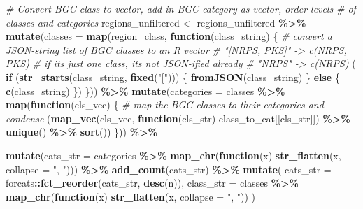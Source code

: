 \documentclass[
]{article}
\newenvironment{Shaded}{\begin{snugshade}}{\end{snugshade}}
\newcommand{\AttributeTok}[1]{\textcolor[rgb]{0.13,0.29,0.53}{#1}}
\newcommand{\CommentTok}[1]{\textcolor[rgb]{0.56,0.35,0.01}{\textit{#1}}}
\newcommand{\ControlFlowTok}[1]{\textcolor[rgb]{0.13,0.29,0.53}{\textbf{#1}}}
\newcommand{\FunctionTok}[1]{\textcolor[rgb]{0.13,0.29,0.53}{\textbf{#1}}}
\newcommand{\NormalTok}[1]{#1}
\newcommand{\OtherTok}[1]{\textcolor[rgb]{0.56,0.35,0.01}{#1}}
\newcommand{\SpecialCharTok}[1]{\textcolor[rgb]{0.81,0.36,0.00}{\textbf{#1}}}
\newcommand{\StringTok}[1]{\textcolor[rgb]{0.31,0.60,0.02}{#1}}
\begin{document}
\begin{Shaded}
\begin{Highlighting}[]
\CommentTok{\# Convert BGC \textquotesingle{}class\textquotesingle{} to vector, add in BGC \textquotesingle{}category\textquotesingle{} as vector, order levels}
\CommentTok{\# of classes and categories}
\NormalTok{regions\_unfiltered }\OtherTok{\textless{}{-}}\NormalTok{ regions\_unfiltered }\SpecialCharTok{\%\textgreater{}\%}
  \FunctionTok{mutate}\NormalTok{(}\AttributeTok{classes =} \FunctionTok{map}\NormalTok{(region\_class, }\ControlFlowTok{function}\NormalTok{(class\_string) \{}
    \CommentTok{\# convert a JSON{-}string list of BGC classes to an R vector}
    \CommentTok{\# "[\textquotesingle{}NRPS\textquotesingle{}, \textquotesingle{}PKS\textquotesingle{}]" {-}\textgreater{} c(\textquotesingle{}NRPS\textquotesingle{}, \textquotesingle{}PKS\textquotesingle{})}
    \CommentTok{\# if it\textquotesingle{}s just one class, it\textquotesingle{}s not JSON{-}ified already}
    \CommentTok{\# "NRPS" {-}\textgreater{} c(\textquotesingle{}NRPS\textquotesingle{})}
\NormalTok{    (}
      \ControlFlowTok{if}\NormalTok{ (}\FunctionTok{str\_starts}\NormalTok{(class\_string, }\FunctionTok{fixed}\NormalTok{(}\StringTok{"["}\NormalTok{))) \{}
        \FunctionTok{fromJSON}\NormalTok{(class\_string)}
\NormalTok{      \} }\ControlFlowTok{else}\NormalTok{ \{}
        \FunctionTok{c}\NormalTok{(class\_string)}
\NormalTok{      \})}
\NormalTok{  \})) }\SpecialCharTok{\%\textgreater{}\%}
  \FunctionTok{mutate}\NormalTok{(}\AttributeTok{categories =}\NormalTok{ classes }\SpecialCharTok{\%\textgreater{}\%} \FunctionTok{map}\NormalTok{(}\ControlFlowTok{function}\NormalTok{(cls\_vec) \{}
    \CommentTok{\# map the BGC classes to their categories and condense}
\NormalTok{    (}\FunctionTok{map\_vec}\NormalTok{(cls\_vec, }\ControlFlowTok{function}\NormalTok{(cls\_str) class\_to\_cat[[cls\_str]]) }\SpecialCharTok{\%\textgreater{}\%} \FunctionTok{unique}\NormalTok{() }\SpecialCharTok{\%\textgreater{}\%} \FunctionTok{sort}\NormalTok{())}
\NormalTok{  \})) }\SpecialCharTok{\%\textgreater{}\%}
  
  \FunctionTok{mutate}\NormalTok{(}\AttributeTok{cats\_str =}\NormalTok{ categories }\SpecialCharTok{\%\textgreater{}\%} \FunctionTok{map\_chr}\NormalTok{(}\ControlFlowTok{function}\NormalTok{(x) }\FunctionTok{str\_flatten}\NormalTok{(x, }\AttributeTok{collapse =} \StringTok{", "}\NormalTok{))) }\SpecialCharTok{\%\textgreater{}\%}
  \FunctionTok{add\_count}\NormalTok{(cats\_str) }\SpecialCharTok{\%\textgreater{}\%}
  \FunctionTok{mutate}\NormalTok{(}
    \AttributeTok{cats\_str =}\NormalTok{ forcats}\SpecialCharTok{::}\FunctionTok{fct\_reorder}\NormalTok{(cats\_str, }\FunctionTok{desc}\NormalTok{(n)),}
    \AttributeTok{class\_str =}\NormalTok{ classes }\SpecialCharTok{\%\textgreater{}\%} \FunctionTok{map\_chr}\NormalTok{(}\ControlFlowTok{function}\NormalTok{(x) }\FunctionTok{str\_flatten}\NormalTok{(x, }\AttributeTok{collapse =} \StringTok{", "}\NormalTok{))}
\NormalTok{  )}


\end{Highlighting}
\end{Shaded}
\end{document}
